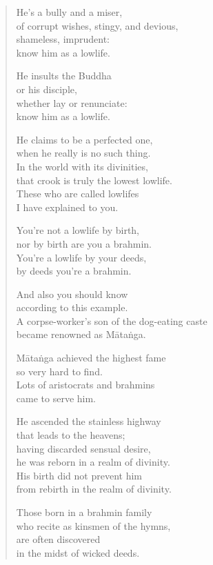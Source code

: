\documentclass[12pt,openany]{book}%
\begin{document}
\begin{verse}
He’s a bully and a miser, \\
of corrupt wishes, stingy, and devious, \\
shameless, imprudent: \\
know him as a lowlife. 

He insults the Buddha \\
or his disciple, \\
whether lay or renunciate: \\
know him as a lowlife. 

He claims to be a perfected one, \\
when he really is no such thing. \\
In the world with its divinities, \\
that crook is truly the lowest lowlife. \\
These who are called lowlifes \\
I have explained to you. 

You’re not a lowlife by birth, \\
nor by birth are you a brahmin. \\
You’re a lowlife by your deeds, \\
by deeds you’re a brahmin. 

And also you should know \\
according to this example. \\
A corpse-worker’s son of the dog-eating caste \\
became renowned as \textsanskrit{Mātaṅga}. 

\textsanskrit{Mātaṅga} achieved the highest fame \\
so very hard to find. \\
Lots of aristocrats and brahmins \\
came to serve him. 

He ascended the stainless highway \\
that leads to the heavens; \\
having discarded sensual desire, \\
he was reborn in a realm of divinity. \\
His birth did not prevent him \\
from rebirth in the realm of divinity. 

Those born in a brahmin family \\
who recite as kinsmen of the hymns, \\
are often discovered \\
in the midst of wicked deeds. 


\end{verse}
\end{document}
